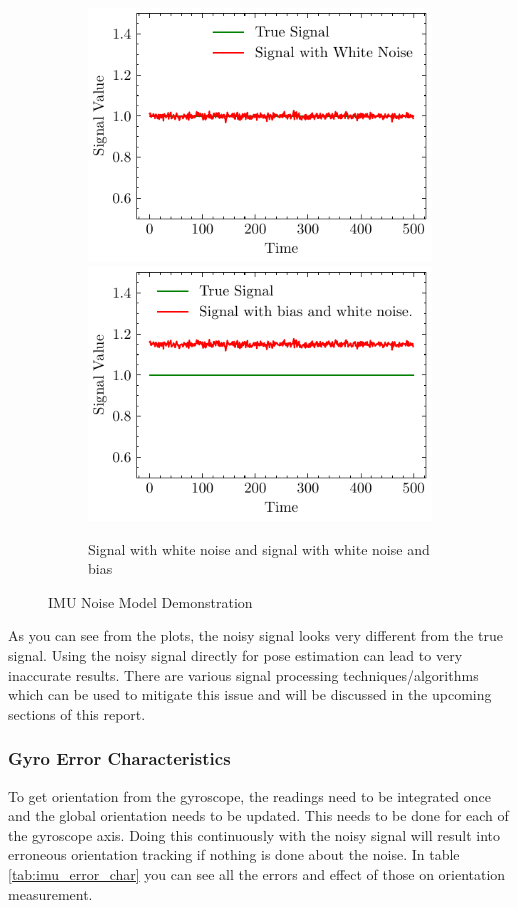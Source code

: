 \begin{figure}
  \begin{subfigure}{\linewidth}
  \includegraphics[width=.5\linewidth]{images/fig_chapter2/noise_figs/signal_white_noise.pdf}\hfill
  \includegraphics[width=.5\linewidth]{images/fig_chapter2/noise_figs/signal_white_noise_bias.pdf}
  \caption{Signal with white noise and signal with white noise and bias}
  \end{subfigure}
  
  \caption{IMU Noise Model Demonstration}

\label{fig:imu_noise}
\end{figure}

As you can see from the plots, the noisy signal looks very different from the true signal. Using the noisy signal directly for pose estimation can lead to very inaccurate results. There are various signal processing techniques/algorithms which can be used to mitigate this issue and will be discussed in the upcoming sections of this report.

\subsubsection{Gyro Error Characteristics}
To get orientation from the gyroscope, the readings need to be integrated once and the global orientation needs to be updated. This needs to be done for each of the gyroscope axis. Doing this continuously with the noisy signal will result into erroneous  orientation tracking if nothing is done about the noise. In table \ref{tab:imu_error_char} you can see all the errors and effect of those on orientation measurement.


